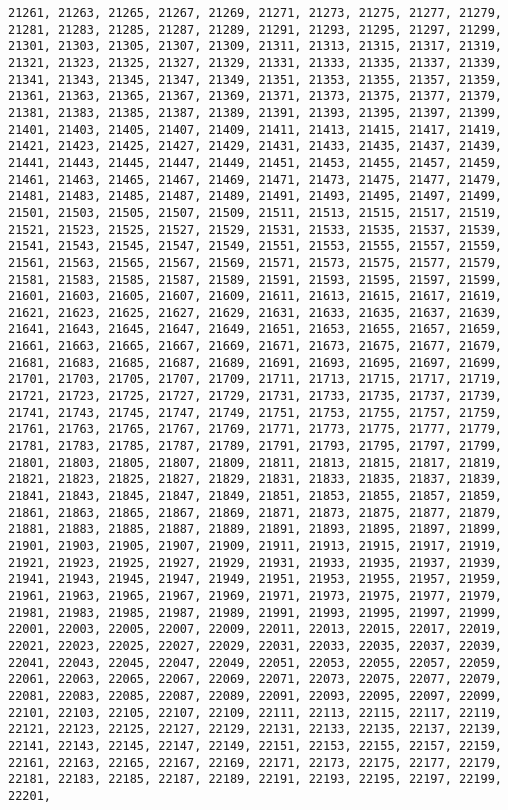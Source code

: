 \documentclass[11pt]{article}
\begin{document}
\begin{Verbatim}[commandchars=\\\{\}]
21261, 21263, 21265, 21267, 21269, 21271, 21273, 21275, 21277, 21279, 21281, 21283, 21285, 21287, 21289, 21291, 21293, 21295, 21297, 21299, 21301, 21303, 21305, 21307, 21309, 21311, 21313, 21315, 21317, 21319, 21321, 21323, 21325, 21327, 21329, 21331, 21333, 21335, 21337, 21339, 21341, 21343, 21345, 21347, 21349, 21351, 21353, 21355, 21357, 21359, 21361, 21363, 21365, 21367, 21369, 21371, 21373, 21375, 21377, 21379, 21381, 21383, 21385, 21387, 21389, 21391, 21393, 21395, 21397, 21399, 21401, 21403, 21405, 21407, 21409, 21411, 21413, 21415, 21417, 21419, 21421, 21423, 21425, 21427, 21429, 21431, 21433, 21435, 21437, 21439, 21441, 21443, 21445, 21447, 21449, 21451, 21453, 21455, 21457, 21459, 21461, 21463, 21465, 21467, 21469, 21471, 21473, 21475, 21477, 21479, 21481, 21483, 21485, 21487, 21489, 21491, 21493, 21495, 21497, 21499, 21501, 21503, 21505, 21507, 21509, 21511, 21513, 21515, 21517, 21519, 21521, 21523, 21525, 21527, 21529, 21531, 21533, 21535, 21537, 21539, 21541, 21543, 21545, 21547, 21549, 21551, 21553, 21555, 21557, 21559, 21561, 21563, 21565, 21567, 21569, 21571, 21573, 21575, 21577, 21579, 21581, 21583, 21585, 21587, 21589, 21591, 21593, 21595, 21597, 21599, 21601, 21603, 21605, 21607, 21609, 21611, 21613, 21615, 21617, 21619, 21621, 21623, 21625, 21627, 21629, 21631, 21633, 21635, 21637, 21639, 21641, 21643, 21645, 21647, 21649, 21651, 21653, 21655, 21657, 21659, 21661, 21663, 21665, 21667, 21669, 21671, 21673, 21675, 21677, 21679, 21681, 21683, 21685, 21687, 21689, 21691, 21693, 21695, 21697, 21699, 21701, 21703, 21705, 21707, 21709, 21711, 21713, 21715, 21717, 21719, 21721, 21723, 21725, 21727, 21729, 21731, 21733, 21735, 21737, 21739, 21741, 21743, 21745, 21747, 21749, 21751, 21753, 21755, 21757, 21759, 21761, 21763, 21765, 21767, 21769, 21771, 21773, 21775, 21777, 21779, 21781, 21783, 21785, 21787, 21789, 21791, 21793, 21795, 21797, 21799, 21801, 21803, 21805, 21807, 21809, 21811, 21813, 21815, 21817, 21819, 21821, 21823, 21825, 21827, 21829, 21831, 21833, 21835, 21837, 21839, 21841, 21843, 21845, 21847, 21849, 21851, 21853, 21855, 21857, 21859, 21861, 21863, 21865, 21867, 21869, 21871, 21873, 21875, 21877, 21879, 21881, 21883, 21885, 21887, 21889, 21891, 21893, 21895, 21897, 21899, 21901, 21903, 21905, 21907, 21909, 21911, 21913, 21915, 21917, 21919, 21921, 21923, 21925, 21927, 21929, 21931, 21933, 21935, 21937, 21939, 21941, 21943, 21945, 21947, 21949, 21951, 21953, 21955, 21957, 21959, 21961, 21963, 21965, 21967, 21969, 21971, 21973, 21975, 21977, 21979, 21981, 21983, 21985, 21987, 21989, 21991, 21993, 21995, 21997, 21999, 22001, 22003, 22005, 22007, 22009, 22011, 22013, 22015, 22017, 22019, 22021, 22023, 22025, 22027, 22029, 22031, 22033, 22035, 22037, 22039, 22041, 22043, 22045, 22047, 22049, 22051, 22053, 22055, 22057, 22059, 22061, 22063, 22065, 22067, 22069, 22071, 22073, 22075, 22077, 22079, 22081, 22083, 22085, 22087, 22089, 22091, 22093, 22095, 22097, 22099, 22101, 22103, 22105, 22107, 22109, 22111, 22113, 22115, 22117, 22119, 22121, 22123, 22125, 22127, 22129, 22131, 22133, 22135, 22137, 22139, 22141, 22143, 22145, 22147, 22149, 22151, 22153, 22155, 22157, 22159, 22161, 22163, 22165, 22167, 22169, 22171, 22173, 22175, 22177, 22179, 22181, 22183, 22185, 22187, 22189, 22191, 22193, 22195, 22197, 22199, 22201, 
\end{Verbatim}
\end{document}

